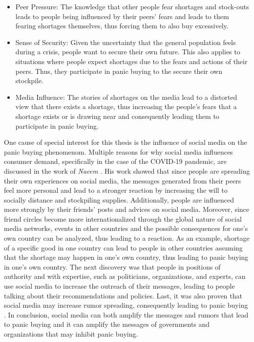 \begin{itemize}
    \item Peer Pressure: The knowledge that other people fear shortages and 
    stock-outs leads to people being influenced by their peers' fears and leads
    to them fearing shortages themselves, thus forcing them to also buy excessively.
    \item Sense of Security: Given the uncertainty that the general population
    feels during a crisis, people want to secure their own future. This 
    also applies to situations where people expect 
    shortages due to the fears and actions of their peers.
    Thus, they participate in panic buying to the secure their
    own stockpile.
    \item Media Influence: The stories of shortages on the media
    lead to a distorted view that there exists a shortage, thus increasing 
    the people's fears that a shortage exists or is drawing near and consequently
    leading them to participate in panic buying.
\end{itemize}

One cause of special interest for this thesis is the influence of 
social media on the panic buying phenomenom. 
Multiple reasons for why social media influences consumer demand, 
specifically in the case of the COVID-19 pandemic,
are discussed in the work of \textit{Naeem} \cite{naeem2021social}.
His work showed that since people are spreading their 
own experiences on social media, the messages generated from their peers feel
more personal and lead to a stronger reaction by increasing the will to 
socially distance and stockpiling supplies. Additionally, people are 
influenced more strongly by their friends' posts and advices on social media.
Moreover, since friend circles become more 
internationalized through the global nature of social media networks,
events in other countries and the
possible consequences for one's own country can be analyzed, thus
leading to a reaction. As an example,
shortage of a specific good in one country can lead to people in other countries
assuming that the shortage may happen in one's own country, thus leading to 
panic buying in one's own country. 
The next discovery was that people in positions of authority and with expertise,
such as politicians, organizations, and experts, can use social media to increase 
the outreach of their messages, leading to people talking about their 
recommendations and policies.
Last, it was also proven that social media may increase rumor spreading,
consequently leading to panic buying \cite{naeem2022understanding}.
In conclusion, social media can both amplify the messages and rumors that lead to 
panic buying and it can amplify the messages of governments and organizations 
that may inhibit panic buying.



